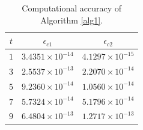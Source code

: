 \documentclass[preprint,11pt,3p]{elsarticle}
\begin{document}
\begin{table}[H]
	\begin{center}
		\begin{tabular}{ c  c c} %
			\toprule
			$t$ &$\epsilon_{c1} $  & $\epsilon_{c2}$\\
			\midrule
			$1$     & $3.4351 \times 10^{-14}$&            $4.1297 \times 10^{-15} $     \\
			$3$    & $2.5537 \times 10^{-13}$ &            $2.2070 \times 10^{-14} $        \\ 
			$5$  & $9.2360 \times 10^{-14}$& $1.0560 \times 10^{-14} $        \\ 
			$7$    & $5.7324 \times 10^{-14}$&            $5.1796 \times 10^{-14} $          \\ 
			$9$   & $6.4804 \times 10^{-13}$               & $1.2717 \times 10^{-13} $       \\
			\bottomrule
		\end{tabular}
		\caption{Computational accuracy of Algorithm \ref{alg1}.} \label{tab11}
	\end{center}
\end{table}
\end{document}
